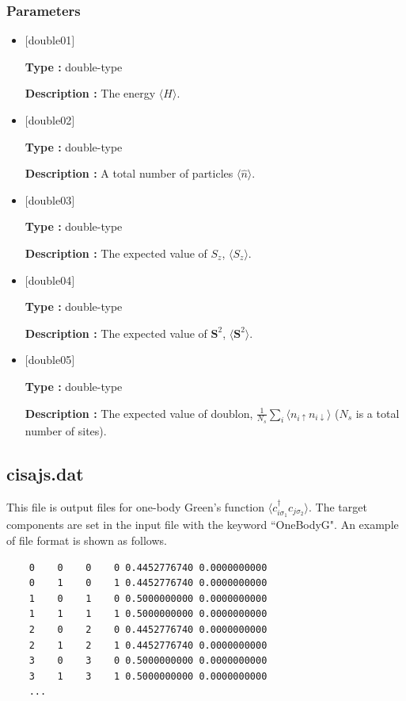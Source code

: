 \subsubsection{Parameters}
 \begin{itemize}

  \item  $[$double01$]$
  
 {\bf Type :} double-type

{\bf Description :} The energy $\langle H\rangle$. 
 
  \item $[$double02$]$

 {\bf Type :} double-type 

{\bf Description :}  A total number of particles $\langle \hat{n}\rangle$.

  \item $[$double03$]$

 {\bf Type :} double-type 

{\bf Description :}  The expected value of $S_z$, $\langle S_z\rangle$. 

  \item $[$double04$]$

 {\bf Type :} double-type 

{\bf Description :}  The expected value of ${\bm S^2}$, $\langle {\bm S^2}\rangle$. 

  \item $[$double05$]$

 {\bf Type :} double-type 

{\bf Description :}  The expected value of doublon, 
$\frac{1}{N_s} \sum_{i}\langle n_{i\uparrow}n_{i\downarrow}\rangle$ ($N_{s}$ is a total number of sites).


 \end{itemize}

\newpage
\subsection{cisajs.dat}
\label{Subsec:cgcisajs}
This file is output files for one-body Green's function $\langle c_{i\sigma_1}^{\dagger}c_{j\sigma_2}\rangle$. 
The target components are set in the input file with the keyword ``OneBodyG".
An example of file format is shown as follows.

\begin{minipage}{12.5cm}
\begin{screen}
\begin{verbatim}
    0    0    0    0 0.4452776740 0.0000000000
    0    1    0    1 0.4452776740 0.0000000000
    1    0    1    0 0.5000000000 0.0000000000
    1    1    1    1 0.5000000000 0.0000000000
    2    0    2    0 0.4452776740 0.0000000000
    2    1    2    1 0.4452776740 0.0000000000
    3    0    3    0 0.5000000000 0.0000000000
    3    1    3    1 0.5000000000 0.0000000000
    ...
\end{verbatim}
\end{screen}
\end{minipage}

